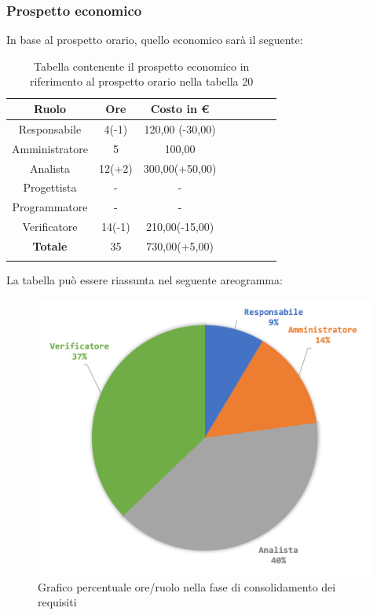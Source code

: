 		\subsubsection{Prospetto economico}
			In base al prospetto orario, quello economico sarà il seguente: 
			
			\begin{longtable}{|c|c|c|c|c|c|c|c}
				\hline
				\rowcolor{lighter-grayer}
				\textbf{Ruolo} & \textbf{Ore} & \textbf{Costo in €} \\
				\hline
				\endfirsthead
				
				\hline
				Responsabile & 4(-1) & 120,00 (-30,00)\\
				\hline
				\hline
				Amministratore & 5 & 100,00\\
				\hline
				\hline
				Analista & 12(+2) & 300,00(+50,00)\\
				\hline
				\hline
				Progettista & - & -\\
				\hline
				\hline
				Programmatore & -  & -\\
				\hline
				\hline
				Verificatore & 14(-1) & 210,00(-15,00)\\
				\hline
				\textbf{Totale} & 35 & 730,00(+5,00)\\
				\hline
				\caption{Tabella contenente il prospetto economico in riferimento al prospetto orario nella tabella 20}
			\end{longtable}
			\pagebreak
			
			La tabella può essere riassunta nel seguente areogramma:
			\begin{figure}[H]
				\centering
				\includegraphics[width=0.8\linewidth]{images/consuntivo/ConsReqCons2.png}
				\caption{Grafico percentuale ore/ruolo nella fase di consolidamento dei requisiti}
				\label{fig:grafico costi ruolo fase di consolidamento dei requisiti}
			\end{figure}
		
